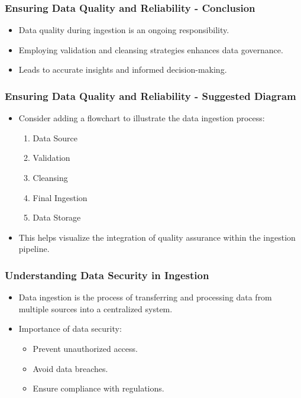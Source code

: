 \documentclass{beamer}
\begin{document}
\begin{frame}[fragile]
    \frametitle{Ensuring Data Quality and Reliability - Conclusion}
    \begin{itemize}
        \item Data quality during ingestion is an ongoing responsibility.
        \item Employing validation and cleansing strategies enhances data governance.
        \item Leads to accurate insights and informed decision-making.
    \end{itemize}
\end{frame}

\begin{frame}[fragile]
    \frametitle{Ensuring Data Quality and Reliability - Suggested Diagram}
    \begin{itemize}
        \item Consider adding a flowchart to illustrate the data ingestion process:
            \begin{enumerate}
                \item Data Source
                \item Validation
                \item Cleansing
                \item Final Ingestion
                \item Data Storage
            \end{enumerate}
        \item This helps visualize the integration of quality assurance within the ingestion pipeline.
    \end{itemize}
\end{frame}

\begin{frame}[fragile]
    \frametitle{Understanding Data Security in Ingestion}
    \begin{itemize}
        \item Data ingestion is the process of transferring and processing data from multiple sources into a centralized system.
        \item Importance of data security:
        \begin{itemize}
            \item Prevent unauthorized access.
            \item Avoid data breaches.
            \item Ensure compliance with regulations.
        \end{itemize}
    \end{itemize}
\end{frame}
\end{document}

